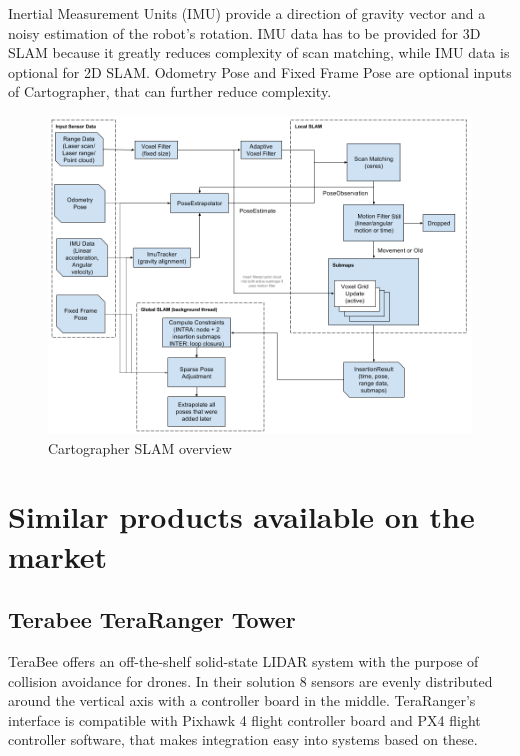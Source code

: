Inertial Measurement Units (IMU) provide a direction of gravity vector and a noisy estimation of the robot's
rotation. IMU data has to be provided for 3D SLAM because it greatly reduces complexity of scan matching,
while IMU data is optional for 2D SLAM. Odometry Pose and Fixed Frame Pose are optional inputs of 
Cartographer, that can further reduce complexity.


\begin{figure}[!hb]
    \centering
	\includegraphics[width=140mm, keepaspectratio]{figures/cartographer_slam.png}
    \caption{Cartographer SLAM overview\cite{CartographerDocumentation}}
    \label{fig:cartographer_slam_overview}
\end{figure}



\section{Similar products available on the market} 

\subsection{Terabee TeraRanger Tower} \label{sect:TerabeeDescription}
TeraBee offers an off-the-shelf solid-state LIDAR system with the purpose of collision avoidance for drones.
In their solution 8 sensors are evenly distributed around the vertical axis with a controller board in 
the middle. TeraRanger's interface is compatible with Pixhawk 4 flight controller board and 
PX4 flight controller software, that makes integration easy into systems based on these.

